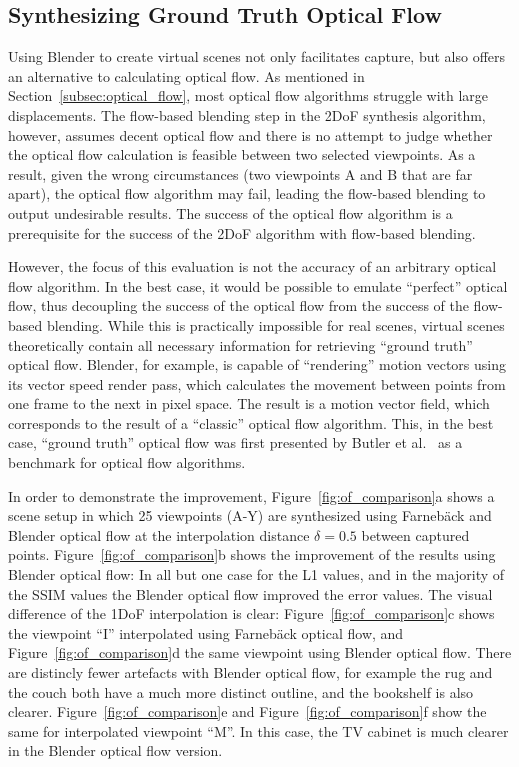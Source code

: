 \subsection{Synthesizing Ground Truth Optical Flow} \label{subsec:gt_of}
Using Blender to create virtual scenes not only facilitates capture, but also offers an alternative to calculating optical flow. As mentioned in Section~\ref{subsec:optical_flow}, most optical flow algorithms struggle with large displacements. The flow-based blending step in the 2DoF synthesis algorithm, however, assumes decent optical flow and there is no attempt to judge whether the optical flow calculation is feasible between two selected viewpoints. As a result, given the wrong circumstances (two viewpoints A and B that are far apart), the optical flow algorithm may fail, leading the flow-based blending to output undesirable results. The success of the optical flow algorithm is a prerequisite for the success of the 2DoF algorithm with flow-based blending.

However, the focus of this evaluation is not the accuracy of an arbitrary optical flow algorithm. In the best case, it would be possible to emulate ``perfect'' optical flow, thus decoupling the success of the optical flow from the success of the flow-based blending. While this is practically impossible for real scenes, virtual scenes theoretically contain all necessary information for retrieving ``ground truth'' optical flow. Blender, for example, is capable of ``rendering'' motion vectors using its vector speed render pass, which calculates the movement between points from one frame to the next in pixel space. The result is a motion vector field, which corresponds to the result of a ``classic'' optical flow algorithm. This, in the best case, ``ground truth'' optical flow was first presented by Butler et al.\ \cite{sintel} as a benchmark for optical flow algorithms.

In order to demonstrate the improvement, Figure~\ref{fig:of_comparison}a shows a scene setup in which 25 viewpoints (A-Y) are synthesized using Farneb\"ack and Blender optical flow at the interpolation distance $\delta = 0.5$ between captured points. 
Figure~\ref{fig:of_comparison}b shows the improvement of the results using Blender optical flow: In all but one case for the L1 values, and in the majority of the SSIM values the Blender optical flow improved the error values. The visual difference of the 1DoF interpolation is clear: Figure~\ref{fig:of_comparison}c shows the viewpoint ``I'' interpolated using Farneb\"ack optical flow, and Figure~\ref{fig:of_comparison}d the same viewpoint using Blender optical flow. There are distincly fewer artefacts with Blender optical flow, for example the rug and the couch both have a much more distinct outline, and the bookshelf is also clearer. Figure~\ref{fig:of_comparison}e and Figure~\ref{fig:of_comparison}f show the same for interpolated viewpoint ``M''. In this case, the TV cabinet is much clearer in the Blender optical flow version.

